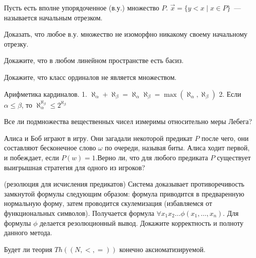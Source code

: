 \setcounter{curtask}{38}


Пусть есть вполне упорядоченное (в.у.) множество $P$.
$\vec{x} = \{y < x \mid x \in P\}$~--- называется начальным отрезком.

\begin{task}
    Доказать, что любое в.у. множество не изоморфно никакому своему начальному отрезку.
\end{task}

\begin{task}
    Докажите, что в любом линейном пространстве есть басиз.
\end{task}

\begin{task}
    Докажите, что класс ординалов не является множеством.
\end{task}

\begin{task}
    Арифметика кардиналов.
    1. $\aleph_{\alpha} + \aleph_{\beta} = \aleph_{\alpha}  \aleph_{\beta} =
    	\max(\aleph_{\alpha}, \aleph_{\beta})$
    2. Если $\alpha \le \beta$, то $\aleph_{\alpha}^{\aleph_{\beta}} \le 2^{\aleph_{\beta}}$
\end{task}

\begin{task}
    Все ли подмножества вещественных чисел измеримы относительно меры Лебега?
\end{task}

\begin{task}
    Алиса и Боб играют в игру. Они загадали некоторой предикат $P$ после чего, они
    составляют бесконечное слово $\omega$ по очереди, называя биты. Алиса ходит
    первой, и побеждает, если $P(w) = 1$.Верно ли, что для любого предиката $P$
    существует выигрышная стратегия для одного из игроков?
\end{task}

\breakline

\begin{ptask}{33}(резолюция для исчисления предикатов)
    Система доказывает противоречивость замкнутой формулы следующим
    образом: формула приводится в предваренную нормальную форму, затем
    проводится скулемизация (избавляемся от функциональных
    символов). Получается формула $\forall x_1 x_2 \dots
    \phi(x_1, \dots, x_n)$. Для формулы $\phi$ делается резолюционный
    вывод. Докажите корректность и полноту данного метода.
\end{ptask}

\begin{ptask}{37}
    Будет ли теория $Th((N, <, =))$ конечно аксиоматизируемой.
\end{ptask}